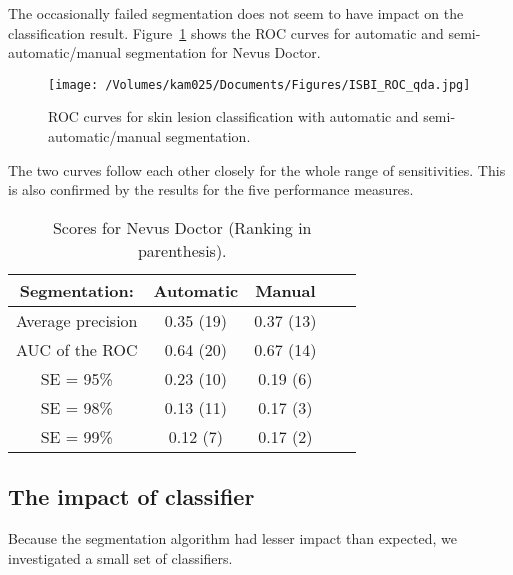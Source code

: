 \documentclass[a4paper,12pt]{article}
\begin{document}
The occasionally failed segmentation does not seem to have impact on the classification result.
Figure~\ref{fig:ROC} shows the ROC curves for automatic and semi-automatic/manual segmentation for Nevus Doctor. 
  \begin{figure}[h!]
     \texttt{[image: /Volumes/kam025/Documents/Figures/ISBI\_ROC\_qda.jpg]}
      \caption{ROC curves for skin lesion classification with automatic and semi-automatic/manual segmentation.}
       \label{fig:ROC}
   \end{figure}
The two curves follow each other closely for the whole range of sensitivities. 
This is also confirmed by the results for the five performance measures.    

\begin{table}[h!]
\begin{tabular}{c | c | c | c | c}
        Segmentation: &{Automatic} & {Manual} \\
        \hline
  Average precision & 0.35 (19) & 0.37 (13) \\
  AUC of the ROC & 0.64 (20) & 0.67 (14) \\
  SE = 95\% & 0.23 (10) & 0.19 (6) \\
  SE = 98\%  & 0.13 (11) & 0.17 (3) \\
  SE = 99\%  & 0.12 (7)  & 0.17 (2)
\end{tabular}
  \caption{Scores for Nevus Doctor (Ranking in parenthesis).}
  \label{tab:ND_Rankings}
\end{table}

\subsection{The impact of classifier} 

Because the segmentation algorithm had lesser impact than expected, we investigated a small set of classifiers. 
\end{document}
